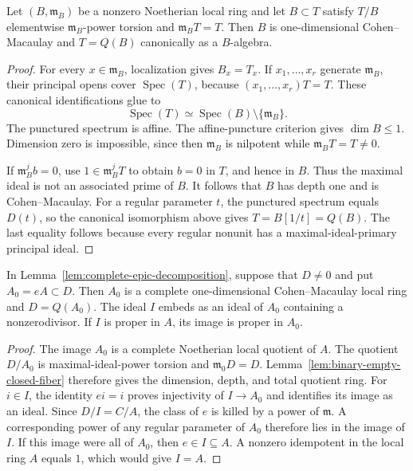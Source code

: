 \begin{lemma}
\label{lem:binary-empty-closed-fiber}
Let $(B,\mathfrak m_B)$ be a nonzero Noetherian local ring and
let $B\subset T$ satisfy
$T/B$ elementwise $\mathfrak m_B$-power torsion and
$\mathfrak m_BT=T$.  Then $B$ is one-dimensional
Cohen--Macaulay and $T=Q(B)$ canonically as a $B$-algebra.
\end{lemma}
\begin{proof}
For every $x\in\mathfrak m_B$, localization gives $B_x=T_x$.
If $x_1,\ldots,x_r$ generate $\mathfrak m_B$, their principal
opens cover $\operatorname{Spec}(T)$, because
$(x_1,\ldots,x_r)T=T$.  These canonical identifications glue to
\[
 \operatorname{Spec}(T)
 \simeq\operatorname{Spec}(B)\setminus\{\mathfrak m_B\}.
\]
The punctured spectrum is affine.  The affine-puncture criterion
\cite[Lemma 31.17.1, Tag 0BCR]{StacksAffinePuncture}
gives $\dim B\le1$.  Dimension zero is impossible, since then
$\mathfrak m_B$ is nilpotent while $\mathfrak m_BT=T\ne0$.

If $\mathfrak m_B^j b=0$, use
$1\in\mathfrak m_B^jT$ to obtain $b=0$ in $T$, and hence in $B$.
Thus the maximal ideal is not an associated prime of $B$.
It follows that $B$ has depth one and is Cohen--Macaulay.
For a regular parameter $t$, the punctured spectrum equals
$D(t)$, so the canonical isomorphism above gives
$T=B[1/t]=Q(B)$.  The last equality follows because every
regular nonunit has a maximal-ideal-primary principal ideal.
\end{proof}

\begin{lemma}
\label{lem:selected-punctured-curve}
In Lemma~\ref{lem:complete-epic-decomposition}, suppose that
$D\ne0$ and put $A_0=eA\subset D$.
Then $A_0$ is a complete one-dimensional Cohen--Macaulay local
ring and $D=Q(A_0)$.  The ideal $I$ embeds as an ideal of $A_0$
containing a nonzerodivisor.  If $I$ is proper in $A$, its image
is proper in $A_0$.
\end{lemma}
\begin{proof}
The image $A_0$ is a complete Noetherian local quotient of $A$.
The quotient $D/A_0$ is maximal-ideal-power torsion and
$\mathfrak m_0D=D$.  Lemma~\ref{lem:binary-empty-closed-fiber}
therefore gives the dimension, depth, and total quotient ring.
For $i\in I$, the identity $ei=i$ proves injectivity of
$I\to A_0$ and identifies its image as an ideal.
Since $D/I=C/A$, the class of $e$ is killed by a power of
$\mathfrak m$.  A corresponding power of any regular parameter
of $A_0$ therefore lies in the image of $I$.
If this image were all of $A_0$, then $e\in I\subseteq A$.
A nonzero idempotent in the local ring $A$ equals $1$,
which would give $I=A$.
\end{proof}

